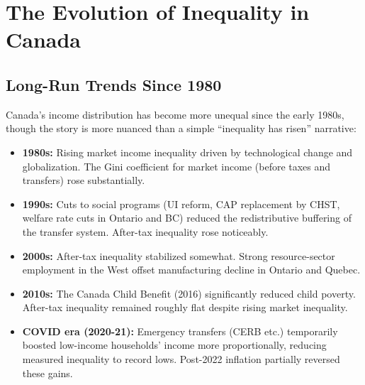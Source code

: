 \section{The Evolution of Inequality in Canada}

\subsection{Long-Run Trends Since 1980}

Canada's income distribution has become more unequal since the early 1980s, though the story is more nuanced than a simple ``inequality has risen'' narrative:

\begin{itemize}
  \item \textbf{1980s:} Rising market income inequality driven by technological change and globalization. The Gini coefficient for market income (before taxes and transfers) rose substantially.
  \item \textbf{1990s:} Cuts to social programs (UI reform, CAP replacement by CHST, welfare rate cuts in Ontario and BC) reduced the redistributive buffering of the transfer system. After-tax inequality rose noticeably.
  \item \textbf{2000s:} After-tax inequality stabilized somewhat. Strong resource-sector employment in the West offset manufacturing decline in Ontario and Quebec.
  \item \textbf{2010s:} The Canada Child Benefit (2016) significantly reduced child poverty. After-tax inequality remained roughly flat despite rising market inequality.
  \item \textbf{COVID era (2020-21):} Emergency transfers (CERB etc.) temporarily boosted low-income households' income more proportionally, reducing measured inequality to record lows. Post-2022 inflation partially reversed these gains.
\end{itemize}

